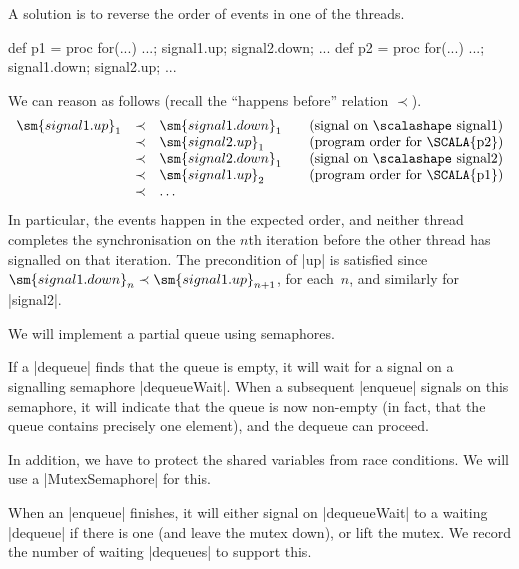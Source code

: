 \begin{slide}

A solution is to reverse the order of events in one of the threads.
\begin{scala}
def p1 = proc{ for(...){ ...; signal1.up; signal2.down; ... } }
def p2 = proc{ for(...){ ...; signal1.down; signal2.up; ... } }
\end{scala}
%
We can reason as follows (recall the ``happens before'' relation $\prec$).
\[
\begin{array}{rcl@{\qquad}l}
\sm{signal1.up}_1 & \prec & \sm{signal1.down}_1 & 
  \mbox{(signal on {\scalashape signal1})} \\
 & \prec & \sm{signal2.up}_1 & \mbox{(program order for \SCALA{p2})} \\
 & \prec & \sm{signal2.down}_1 & \mbox{(signal on {\scalashape signal2})} \\
 & \prec & \sm{signal1.up}_2 & \mbox{(program order for \SCALA{p1})} \\
 & \prec & \ldots
\end{array}
\]
In particular, the events happen in the expected order, and neither thread
completes the synchronisation on the $n$th iteration before the other thread
has signalled on that iteration.
%
The precondition of |up| is satisfied since $\sm{signal1.down}_n \prec
\sm{signal1.up}_{n+1}$, for each~$n$, and similarly for |signal2|.
\end{slide}


\begin{slide}

We will implement a partial queue using semaphores.  

If a |dequeue| finds that the queue is empty, it will wait for a signal on a
signalling semaphore |dequeueWait|.  When a subsequent |enqueue| signals on
this semaphore, it will indicate that the queue is now non-empty (in fact,
that the queue contains precisely one element), and the dequeue can proceed.

In addition, we have to protect the shared variables from race conditions.  We
will use a |MutexSemaphore| for this. 

When an |enqueue| finishes, it will either signal on |dequeueWait| to a
waiting |dequeue| if there is one (and leave the mutex down), or lift the
mutex.  We record the number of waiting |dequeues| to support this.
\end{slide}

